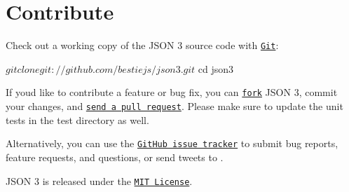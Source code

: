 \section*{Contribute}

Check out a working copy of the J\+S\+ON 3 source code with \href{http://git-scm.com/}{\tt Git}\+: \begin{DoxyVerb}$ git clone git://github.com/bestiejs/json3.git
$ cd json3
\end{DoxyVerb}


If you\textquotesingle{}d like to contribute a feature or bug fix, you can \href{http://help.github.com/fork-a-repo/}{\tt fork} J\+S\+ON 3, commit your changes, and \href{http://help.github.com/send-pull-requests/}{\tt send a pull request}. Please make sure to update the unit tests in the {\ttfamily test} directory as well.

Alternatively, you can use the \href{https://github.com/bestiejs/json3/issues}{\tt Git\+Hub issue tracker} to submit bug reports, feature requests, and questions, or send tweets to \href{http://twitter.com/kitcambridge}{\tt }.

J\+S\+ON 3 is released under the \href{http://kit.mit-license.org/}{\tt M\+IT License}. 